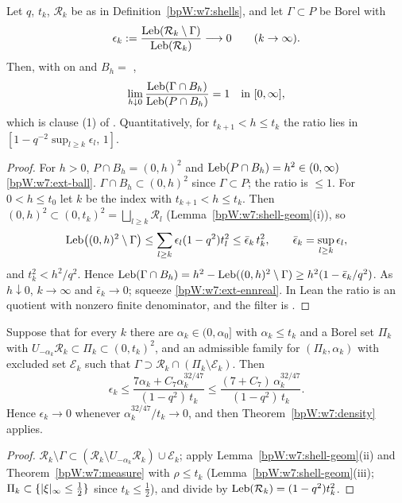 \begin{theorem}\label{bpW:w7:density}
Let $q$, $t_k$, $\mathcal R_k$ be as in Definition~\ref{bpW:w7:shells}, and let $\Gamma\subset P$ be Borel with
\[\epsilon_k:=\frac{\operatorname{Leb}(\mathcal R_k\setminus\Gamma)}{\operatorname{Leb}(\mathcal R_k)}\longrightarrow0\qquad(k\to\infty).\]
Then, with  on  and $B_h=$ ,
\[\lim_{h\downarrow0}\frac{\operatorname{Leb}(\Gamma\cap B_h)}{\operatorname{Leb}(P\cap B_h)}=1\quad\text{in }[0,\infty],\]
which is clause (1) of . Quantitatively, for $t_{k+1}<h\le t_k$ the ratio lies in
$[1-q^{-2}\sup_{l\ge k}\epsilon_l,\,1]$.
\end{theorem}
\begin{proof}
\label{stepW:w7:den}
For $h>0$, $P\cap B_h=(0,h)^2$ and $\operatorname{Leb}(P\cap B_h)=h^2\in(0,\infty)$ \ref{bpW:w7:ext-ball}.
\label{stepW:w7:upper}
$\Gamma\cap B_h\subset(0,h)^2$ since $\Gamma\subset P$; the ratio is $\le1$.
\label{stepW:w7:lower}
For $0<h\le t_0$ let $k$ be the index with $t_{k+1}<h\le t_k$. Then $(0,h)^2\subset(0,t_k)^2=\bigsqcup_{l\ge k}
\mathcal R_l$ (Lemma~\ref{bpW:w7:shell-geom}(i)), so
\[\operatorname{Leb}\bigl((0,h)^2\setminus\Gamma\bigr)\le\sum_{l\ge k}\epsilon_l(1-q^2)t_l^2\le\bar\epsilon_k\,t_k^2,
\qquad\bar\epsilon_k=\sup_{l\ge k}\epsilon_l,\]
and $t_k^2<h^2/q^2$. Hence $\operatorname{Leb}(\Gamma\cap B_h)=h^2-\operatorname{Leb}((0,h)^2\setminus\Gamma)\ge h^2(1-\bar\epsilon_k/q^2)$.
\label{stepW:w7:limit}
As $h\downarrow0$, $k\to\infty$ and $\bar\epsilon_k\to0$; squeeze \ref{bpW:w7:ext-ennreal}. In Lean the ratio is an
 quotient with nonzero finite denominator, and the filter is .
\end{proof}

\begin{corollary}\label{bpW:w7:shell-est}
Suppose that for every $k$ there are $\alpha_k\in(0,\alpha_0]$ with $\alpha_k\le t_k$ and a Borel set $\Pi_k$ with
$U_{-\alpha_k}\mathcal R_k\subset\Pi_k\subset(0,t_k)^2$, and an admissible family for $(\Pi_k,\alpha_k)$ with excluded
set $\mathcal E_k$ such that $\Gamma\supset\mathcal R_k\cap(\Pi_k\setminus\mathcal E_k)$. Then
\[\epsilon_k\le\frac{7\alpha_k+C_7\alpha_k^{32/47}}{(1-q^2)\,t_k}\le\frac{(7+C_7)\,\alpha_k^{32/47}}{(1-q^2)\,t_k}.\]
Hence $\epsilon_k\to0$ whenever $\alpha_k^{32/47}/t_k\to0$, and then Theorem~\ref{bpW:w7:density} applies.
\end{corollary}
\begin{proof}
$\mathcal R_k\setminus\Gamma\subset(\mathcal R_k\setminus U_{-\alpha_k}\mathcal R_k)\cup\mathcal E_k$; apply
Lemma~\ref{bpW:w7:shell-geom}(ii) and Theorem~\ref{bpW:w7:measure} with $\rho\le t_k$
(Lemma~\ref{bpW:w7:shell-geom}(iii); $\Pi_k\subset\{\lvert \xi\rvert_\infty\le\frac12\}$ since $t_k\le\frac12$), and divide by
$\operatorname{Leb}(\mathcal R_k)=(1-q^2)t_k^2$.
\end{proof}

